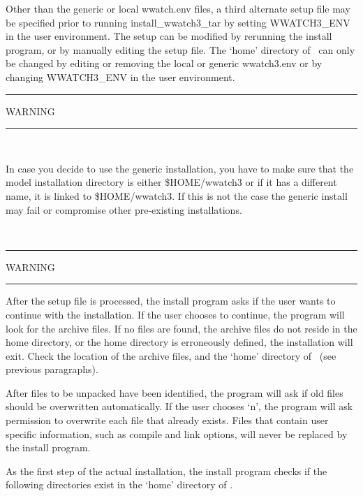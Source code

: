 Other than the generic or local wwatch.env files, a third alternate
setup file may be specified prior to running {\file install\_wwatch3\_tar} by
setting {\code WWATCH3\_ENV} in the user environment.  The setup can be
modified by rerunning the install program, or by manually editing the setup
file. The `home' directory of \ws\ can only be changed by editing or removing
the local or generic {\file wwatch3.env} or by changing {\code WWATCH3\_ENV} in the user
environment.

\begin{center}
\rule[1mm]{55mm}{1.0mm} WARNING \rule[1mm]{55mm}{1.0mm} \\ 
\vspace{\baselineskip}

\parbox{120mm}{In case you decide to use the generic installation, you have to make sure
that the model installation directory is either {\file \${HOME}/wwatch3} or if it has
a different name, it is linked to {\file \${HOME}/wwatch3}. If this is not the case
the generic install may fail or compromise other pre-existing installations.}
\\ \vspace{\baselineskip} \rule[1mm]{55mm}{1.0mm}
WARNING \rule[1mm]{55mm}{1.0mm}
\end{center}

After the setup file is processed, the install program asks if the user wants
to continue with the installation. If the user chooses to continue, the
program will look for the archive files. If no files are found, the
archive files do not reside in the home directory, or the home directory is
erroneously defined, the installation will exit. 
Check the location of the archive files, and the `home' directory of \ws\
(see previous paragraphs).

After files to be unpacked have been identified, the program will ask if old
files should be overwritten automatically. If the user chooses `n', the
program will ask permission to overwrite each file that already exists. Files
that contain user specific information, such as compile and link options, will
never be replaced by the install program.

As the first step of the actual installation, the install program checks if
the following directories exist in the `home' directory of \ws.
 
\begin{dlist}
\dit{exe }{\ws\ executables.}
\end{dlist}

